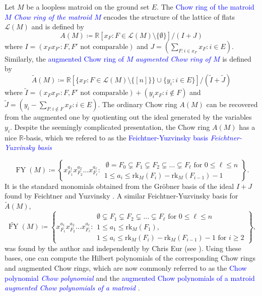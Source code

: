 \documentclass[reqno]{amsart}
\newcommand{\defin}[1]{%
\relax\ifmmode%
\textcolor{blue}{#1}%
\else\textcolor{blue}{\emph{#1}}%
\fi%
}
\newcommand{\rk}{{\mathrm{rk}}}
\renewcommand{\L}{{\mathcal{L}}}
\newcommand{\FY}{\operatorname{FY}}
\theoremstyle{definition}
\theoremstyle{remark}
\begin{document}
Let $M$ be a loopless matroid on the ground set $E$. The \defin{Chow ring of the matroid $M$} encodes the structure of the lattice of flats $\L(M)$ and is defined by
\[
    A(M)\coloneqq \mathbb{R}[x_{F}: F\in\L(M)\setminus\{\emptyset\}]/(I+J)
\]
where $I=(x_Fx_{F'}:F,F' \text{ not comparable})$ and $J=(\sum_{F:i\in x_F}x_F: i\in E)$. Similarly, the \defin{augmented Chow ring of $M$} is defined by
\[
    \widetilde{A}(M)\coloneqq \mathbb{R}[\{x_F:F\in\L(M)\setminus\{[n]\}\}\cup\{y_i:i\in E\}]/(\widetilde{I}+\widetilde{J})
\]   
where $\widetilde{I}=(x_Fx_{F'}:F,F' \text{ not comparable})+(y_ix_F: i\notin F)$ and $\widetilde{J}=(y_i-\sum_{F:i\notin F}x_F: i\in E)$. 
The ordinary Chow ring $A(M)$ can be recovered from the augmented one by quotienting out the ideal generated by the variables $y_i$.
Despite the seemingly complicated presentation, the Chow ring $A(M)$ has a nice $\mathbb{R}$-basis, which we refered to as the \defin{Feichtner-Yuzvinsky basis}
\[
    \FY(M)\coloneqq\left\{x_{F_1}^{a_1}x_{F_2}^{a_2}\ldots x_{F_\ell}^{a_\ell}:\substack{~\emptyset=F_0\subsetneq F_1\subsetneq F_2\subsetneq\ldots\subsetneq F_\ell \text{ for } 0\le \ell\le n \\
    1\le a_i\le \rk_M(F_i)-\rk_M(F_{i-1})-1}\right\}.
\]
It is the standard monomials obtained from the Gr\"{o}bner basis of the ideal $I+J$ found by Feichtner and Yuzvinsky \cite{FeichtnerYuzvinsky2004}. A similar Feichtner-Yuzvinsky basis for $\widetilde{A}(M)$, 
\[
	\widetilde{\FY}(M)\coloneqq\left\{x_{F_1}^{a_1}x_{F_2}^{a_2}\ldots x_{F_\ell}^{a_\ell}: \substack{\emptyset\subsetneq F_1\subsetneq F_2\subsetneq\ldots\subsetneq F_\ell \text{ for }0\le\ell\le n\\
    1\le a_1\le\rk_M(F_1),\\ 
    1\le a_i\le\rk_M(F_i)-\rk_M(F_{i-1})-1 \text{ for }i\ge 2}
    \right\},
\]
was found by the author \cite{Liao2023FPSAC,Liao2023One} and independently by Chris Eur (see \cite{Mastroeni2022Koszul}).
Using these bases, one can compute the Hilbert polynomials of the corresponding Chow rings and augmented Chow rings, which are now commonly referred to as the \defin{Chow polynomial} and the \defin{augmented Chow polynomials of a matroid}.
\end{document}
